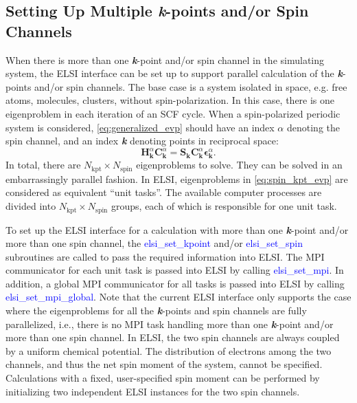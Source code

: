 \documentclass{report}
\begin{document}
\subsection{Setting Up Multiple \textbf{\textit{k}}-points and/or Spin Channels}
\label{subsec:setup_kpt}
When there is more than one \textbf{\textit{k}}-point and/or spin channel in the simulating system, the ELSI interface can be set up to support parallel calculation of the \textbf{\textit{k}}-points and/or spin channels. The base case is a system isolated in space, e.g. free atoms, molecules, clusters, without spin-polarization. In this case, there is one eigenproblem in each iteration of an SCF cycle. When a spin-polarized periodic system is considered, \ref{eq:generalized_evp} should have an index $\alpha$ denoting the spin channel, and an index \textbf{\textit{k}} denoting points in reciprocal space:
\begin{equation}
\label{eq:spin_kpt_evp}
\boldsymbol{H}_{\boldsymbol{k}}^\alpha \boldsymbol{C}_{\boldsymbol{k}}^\alpha = \boldsymbol{S}_{\boldsymbol{k}} \boldsymbol{C}_{\boldsymbol{k}}^\alpha \boldsymbol{\epsilon}_{\boldsymbol{k}}^\alpha .
\end{equation}
In total, there are $N_\text{kpt} \times N_\text{spin}$ eigenproblems to solve. They can be solved in an embarrassingly parallel fashion. In ELSI, eigenproblems in \ref{eq:spin_kpt_evp} are considered as equivalent ``unit tasks''. The available computer processes are divided into $N_\text{kpt} \times N_\text{spin}$ groups, each of which is responsible for one unit task.

To set up the ELSI interface for a calculation with more than one \textbf{\textit{k}}-point and/or more than one spin channel, the \textcolor{blue}{elsi\_set\_kpoint} and/or \textcolor{blue}{elsi\_set\_spin} subroutines are called to pass the required information into ELSI. The MPI communicator for each unit task is passed into ELSI by calling \textcolor{blue}{elsi\_set\_mpi}. In addition, a global MPI communicator for all tasks is passed into ELSI by calling \textcolor{blue}{elsi\_set\_mpi\_global}. Note that the current ELSI interface only supports the case where the eigenproblems for all the \textbf{\textit{k}}-points and spin channels are fully parallelized, i.e., there is no MPI task handling more than one \textbf{\textit{k}}-point and/or more than one spin channel. In ELSI, the two spin channels are always coupled by a uniform chemical potential. The distribution of electrons among the two channels, and thus the net spin moment of the system, cannot be specified. Calculations with a fixed, user-specified spin moment can be performed by initializing two independent ELSI instances for the two spin channels.
\end{document}
